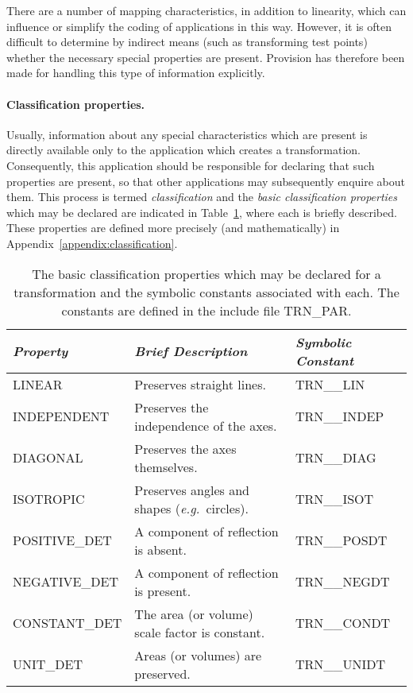 \documentclass[twoside,nolof,11pt]{starlink}
\providecommand{\name}[1]{\small{#1}}
\begin{document}
There are a number of mapping characteristics, in addition to linearity,
which can influence or simplify the coding of applications in this way.
However, it is often difficult to determine by indirect means (such as
transforming test points) whether the necessary special properties are
present.
Provision has therefore been made for handling this type of information
explicitly.

\paragraph{Classification properties.}
Usually, information about any special characteristics which are present is
directly available only to the application which creates a transformation.
Consequently, this application should be responsible for declaring that such
properties are present, so that other applications may subsequently enquire
about them.
This process is termed \emph{classification} and the \emph{basic classification
properties} which may be declared are indicated in
Table~\ref{table:classification}, where each is briefly described.
These properties are defined more precisely (and mathematically) in
Appendix~\ref{appendix:classification}.

\begin{table}[h]
\begin{center}

\begin{tabular}{|l|l|l|}
\hline
\emph{Property} & \emph{Brief Description} & \emph{Symbolic Constant}
\\ \hline
LINEAR & Preserves straight lines. & TRN\_\_LIN \\
INDEPENDENT & Preserves the independence of the axes. & TRN\_\_INDEP \\
DIAGONAL & Preserves the axes themselves. & TRN\_\_DIAG \\
ISOTROPIC & Preserves angles and shapes (\emph{e.g.}\ circles). & TRN\_\_ISOT \\
POSITIVE\_DET & A component of reflection is absent. & TRN\_\_POSDT \\
NEGATIVE\_DET & A component of reflection is present. & TRN\_\_NEGDT \\
CONSTANT\_DET & The area (or volume) scale factor is constant. & TRN\_\_CONDT \\
UNIT\_DET & Areas (or volumes) are preserved. & TRN\_\_UNIDT \\
\hline
\end{tabular}
\end{center}
\caption[Constants]{The basic classification properties which may be declared for a
transformation and the symbolic constants associated with each.
The constants are defined in the include file \name{TRN\_PAR}.}

\label{table:classification}


\end{table}
\end{document}
